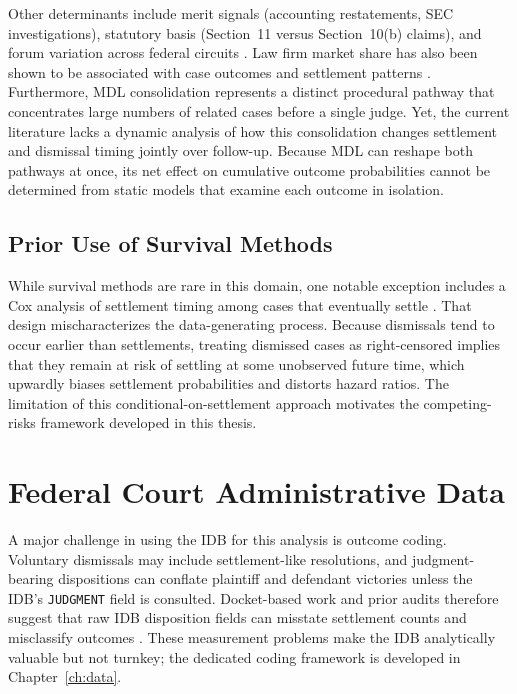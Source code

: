 Other determinants include merit signals (accounting
restatements, SEC investigations), statutory basis
(Section~11 versus Section~10(b) claims), and forum variation
across federal circuits \citep{johnson2001, perino2003}.
Law firm market share has also been shown to be associated
with case outcomes and settlement patterns \citep{wang2022}.
Furthermore, MDL consolidation represents a
distinct procedural pathway that concentrates large numbers
of related cases before a single judge. Yet, the current
literature lacks a dynamic analysis of how this consolidation
changes settlement and dismissal timing jointly over
follow-up. Because MDL can reshape both pathways at once,
its net effect on cumulative outcome probabilities cannot be
determined from static models that examine each outcome
in isolation.

\subsection{Prior Use of Survival Methods}

While survival methods are rare in this domain, one notable
exception includes a Cox analysis of settlement timing among
cases that eventually settle \citep{brochet2014}. That design
mischaracterizes the data-generating process. Because
dismissals tend to occur earlier than settlements, treating
dismissed cases as right-censored implies that they remain at
risk of settling at some unobserved future time, which
upwardly biases settlement probabilities and distorts hazard
ratios. The limitation of this conditional-on-settlement
approach motivates the competing-risks framework developed in
this thesis.

\section{Federal Court Administrative Data}

A major challenge in using the IDB for this analysis is outcome coding. Voluntary dismissals may
include settlement-like resolutions, and judgment-bearing
dispositions can conflate plaintiff and defendant victories
unless the IDB's \texttt{JUDGMENT} field is consulted.
Docket-based work and prior audits therefore suggest that raw
IDB disposition fields can misstate settlement counts and
misclassify outcomes \citep{scales2024, clermont2002,
hadfield2004}. These measurement problems make the IDB
analytically valuable but not turnkey; the dedicated coding
framework is developed in Chapter~\ref{ch:data}.

